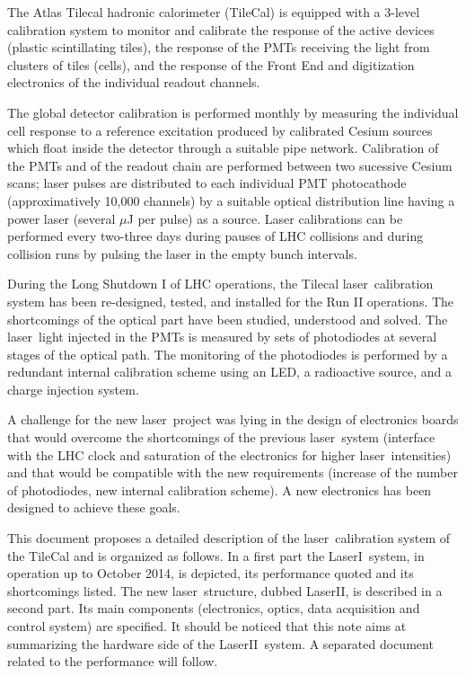 \documentclass[UKenglish,texlive=2013]{\ATLASLATEXPATH atlasdoc}
\newcommand{\laser}{laser}
\newcommand{\lasi}{LaserI}
\newcommand{\lasii}{LaserII}
\begin{document}
The Atlas Tilecal hadronic calorimeter (TileCal) \cite{ref:tilecal} is equipped with a 3-level calibration system to monitor and  calibrate the response of the active devices (plastic scintillating tiles), the response of the PMTs receiving the light from clusters of tiles (cells), and the response of the Front End and digitization electronics of the individual readout channels. \par
The global detector calibration is performed monthly by measuring the individual cell response to a reference excitation produced by calibrated Cesium sources \cite{ref:cesiumscan} which float inside the detector through a suitable pipe network.
Calibration of the PMTs and of the readout chain are performed between two sucessive Cesium scans; laser pulses are distributed to each individual PMT photocathode (approximatively 10,000 channels) by a suitable optical distribution line having a power laser (several $\mu$J per pulse) as a source. Laser calibrations can be performed every two-three days during pauses of LHC collisions and during collision runs by pulsing the laser in the empty bunch intervals.  \par
During the Long Shutdown I of LHC operations, the Tilecal \laser~calibration system has been re-designed, tested, and installed for the Run II operations. The shortcomings of the optical part have been studied, understood and solved. The \laser~light injected in the PMTs is measured by sets of photodiodes at several stages of the optical path. The monitoring of the photodiodes is performed by a redundant internal calibration scheme using an LED, a radioactive source, and a charge injection system. \par
A challenge for the new \laser~project was lying in the design of electronics boards that would overcome the shortcomings of the previous \laser~system (interface with the LHC clock and saturation of the electronics for higher \laser~intensities) and that would be compatible with the new requirements (increase of the number of photodiodes, new internal calibration scheme). A new electronics has been designed to achieve these goals.\par
This document proposes a detailed description of the \laser~calibration system of the TileCal and is organized as follows. In a first part the \lasi~system, in operation up to October 2014, is depicted, its performance quoted and its shortcomings listed. The new \laser~structure, dubbed \lasii, is described in a second part. Its main components (electronics, optics, data acquisition and control system) are specified. It should be noticed that this note aims at summarizing the hardware side of the \lasii~system. A separated document related to the performance will follow. 
\end{document}
